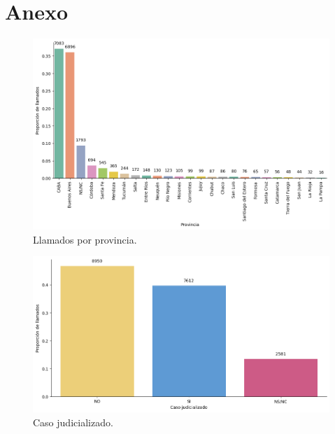 \documentclass[10 pt]{article}
\begin{document}


\newpage
\section*{Anexo}\label{anex}




\begin{figure}[H]
\begin{center}
\includegraphics[scale=.5]{images/latex_llamados_por_provincia.png}
\caption{Llamados por provincia.}
\label{provincia}
\end{center}
\end{figure}

\begin{figure}[H]
\begin{center}
\includegraphics[scale=.5]{images/latex_caso_judicializado.png}
\caption{Caso judicializado.}
\label{casojudicializado}
\end{center}
\end{figure}
\end{document}
